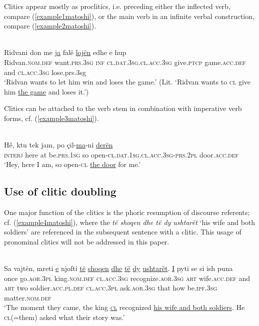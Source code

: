 \documentclass[output=paper]{langsci/langscibook}
\begin{document}
Clitics appear mostly as proclitics, i.e. preceding either the inflected verb, compare (\ref{example1matoshi}), or the main verb in an infinite verbal construction, compare (\ref{example2matoshi}).

\ea
 \label{example2matoshi} 
	\\
	\gll Ridvani don me \uline{ja} falë \uline{lojën} edhe e hup \\
	Ridvan.\textsc{nom.def} want.\textsc{prs.3sg} \textsc{inf} \textsc{cl.dat.3sg.cl.acc.3sg} give.\textsc{ptcp} game.\textsc{acc.def} and \textsc{cl.acc.3sg} lose.prs.3sg \\
	\glt ‘Ridvan wants to let him win and loses the game.’ (Lit. ‘Ridvan wants to \textsc{cl} give him \uline{the game} and loses it.’)
\z

Clitics can be attached to the verb stem in combination with imperative verb forms, cf. (\ref{example3matoshi}).

\ea \label{example3matoshi}
	\\
	\gll Hê, ktu tek jam, po çil-\uline{ma}-ni \uline{derën} \\ 
	\textsc{interj} here at be.\textsc{prs.1sg} so open-\textsc{cl.dat.1sg.cl.acc.3sg-prs.2pl} door.\textsc{acc.def} \\
	\glt ‘Hey, here I am, so open-\textsc{cl} \uline{the door} for me.’
\z

\subsection{Use of clitic doubling}\label{sec:matoshi:2.2}

One major function of the clitics is the phoric resumption of discourse referents; cf. (\ref{example4matoshi}), where the \textit{të shoqen dhe të dy ushtarët} ‘his wife and both soldiers’ are referenced in the subsequent sentence with a clitic. This usage of pronominal clitics will not be addressed in this paper.

\ea \label{example4matoshi} 
	 \\
	\gll Sa vajtën, mreti \uline{e} njofti \uline{të} \uline{shoqen} \uline{dhe} \uline{të} \uline{dy} \uline{ushtarët}. \uline{I} pyti se si ish puna \\ once go.\textsc{aor.3pl} king.\textsc{nom.def} \textsc{cl.acc.3sg} recognize.\textsc{aor.3sg} \textsc{art} wife.\textsc{acc.def} and \textsc{art} two soldier.\textsc{acc.pl.def} \textsc{cl.acc.3pl} ask\textsc{.aor.3sg} that how be.\textsc{ipf.3sg} matter.\textsc{nom.def} \\
	\glt ‘The moment they came, the king \textsc{\uline{cl}} recognized \uline{his wife and both soldiers}. He \textsc{cl}(=them) asked what their story was.’
 \z
\end{document}
